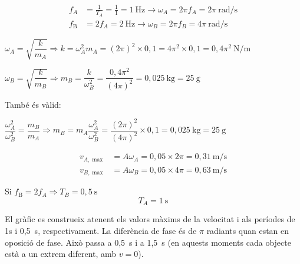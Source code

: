 \begin{solapartat}
\begin{align*}
f_A &= \frac{1}{T_A} = \frac{1}{1} = 1\ \mathrm{Hz} \to \omega_A = 2\pi f_A = 2\pi\ \mathrm{rad/s}\\
f_\mathrm{B} &= 2f_A = 2\ \mathrm{Hz} \to \omega_B = 2\pi f_B = 4\pi\ \mathrm{rad/s}
\end{align*}

 $\omega_A = \sqrt{\dfrac{k}{m_A}} \Rightarrow k = \omega_A^2 m_A = (2\pi)^2\times 0,1 = 4\pi^2\times 0,1 = 0,4\pi^2\ \mathrm{N/m}$

 $\omega_B = \sqrt{\dfrac{k}{m_B}} \Rightarrow m_B = \dfrac{k}{\omega_B^2} = \dfrac{0,4\pi^2}{(4\pi)^2} = 0,025\ \mathrm{kg} = 25\ \mathrm{g}$

També és vàlid:

 $\dfrac{\omega_A^2}{\omega_B^2} = \dfrac{m_B}{m_A} \Rightarrow m_B = m_A\dfrac{\omega_A^2}{\omega_B^2} = \dfrac{(2\pi)^2}{(4\pi)^2}\times 0,1 = 0,025\ \mathrm{kg} = 25\ \mathrm{g}$
\end{solapartat}

\begin{solapartat}
\begin{align*}
v_{A,\max} &= A\omega_A = 0,05\times 2\pi = 0,31\ \mathrm{m/s}\\
v_{B,\max} &= A\omega_B = 0,05\times 4\pi = 0,63\ \mathrm{m/s}
\end{align*}

 Si $f_\mathrm{B} = 2f_A \Rightarrow T_B = 0,5\ \mathrm{s}$
\[ T_A = 1\ \mathrm{s} \]


El gràfic es construeix atenent els valors màxims de la velocitat i als períodes de 1s i 0,5~s, respectivament. La diferència de fase és de $\pi$ radiants quan estan en oposició de fase. Això passa a 0,5~s i a 1,5~s (en aquests moments cada objecte està a un extrem diferent, amb $v=0$).
\end{solapartat}
